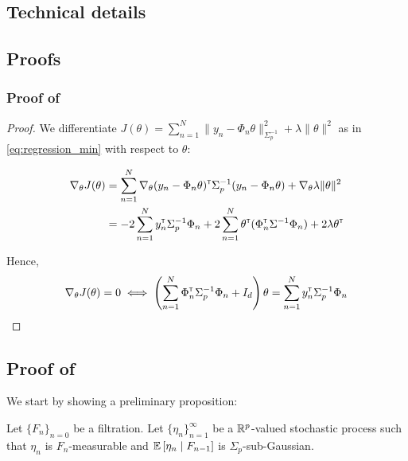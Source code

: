 \begin{subappendices}
	
	\section{Technical details}
	
	\subsection{Proofs}
	\label{sec:proof}
	
	\subsubsection{Proof of }
	
	\begin{proof}
		We differentiate $J(\theta) = \sum_{n=1}^N \|y_n -\Phi_n\theta\|_{\Sigma_p^{-1}}^2 + \lambda\|\theta\|_{}^2$ as in  \eqref{eq:regression_min} with respect to $\theta$:
		
		\begin{align*}
		\nabla_{\theta} J(\theta) &= \sum_{n=1}^N\nabla_{\theta} (y_n - \Phi_n\theta)^{\mathsf{\scriptscriptstyle T}}\Sigma_p^{-1}(y_n - \Phi_n\theta) + \nabla_{\theta} \lambda\|\theta\|_{}^2\\
		&= -2\sum_{n=1}^N y_n^{\mathsf{\scriptscriptstyle T}}\Sigma_p^{-1}\Phi_n + 2\sum_{n=1}^N\theta^{\mathsf{\scriptscriptstyle T}}(\Phi_n^{\mathsf{\scriptscriptstyle T}}\Sigma^{-1}\Phi_n) +  2 \lambda \theta^{\mathsf{\scriptscriptstyle T}}
		\end{align*}
		
		Hence,
		\begin{align*}
		\nabla_{\theta} J(\theta) = 0 \iff \left(\sum_{n=1}^N\Phi_n^{\mathsf{\scriptscriptstyle T}}\Sigma_p^{-1}\Phi_n + I_d\right)\theta = \sum_{n=1}^N y_n^{\mathsf{\scriptscriptstyle T}}\Sigma_p^{-1}\Phi_n
		\end{align*}
	\end{proof}
	
	\subsection{Proof of }
	
	We start by showing a preliminary proposition:
	
	\begin{proposition}
		\label{prop:concentration}
		\begin{leftbar}[propositionbar]
		Let $\{F_n\}_{n=0}$ be a filtration.
		Let $\{\eta_n\}_{n=1}^\infty$ be a $\mathbb{R}^p$-valued stochastic process such that $\eta_n$ is $F_n$-measurable and $\operatorname*{\mathbb{E}}\left[\eta_n\;\middle|\; F_{n-1}\right]$ is $\Sigma_p$-sub-Gaussian.
		

\end{leftbar}
\end{proposition}
\end{subappendices}
